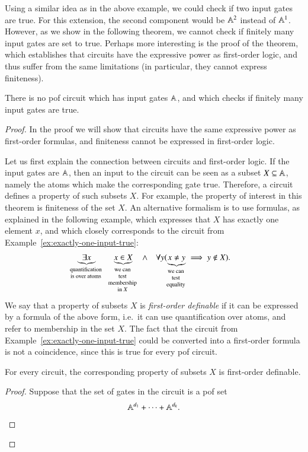 Using a similar idea as in the above example, we could check if two input gates are true. For this extension, the second component would be $\mathbb A^2$ instead of $\mathbb A^1$.  However, as we show in the following theorem, we cannot check if finitely many input gates are set to true. Perhaps more interesting is the proof of the theorem, which establishes that circuits have the expressive power as first-order logic, and thus suffer from the same limitations (in particular, they cannot express finiteness).
\begin{theorem}\label{thm:circuits-finiteness}
	There is no pof circuit which has input gates $\mathbb A$, and which checks if finitely many input gates are true.
\end{theorem}
\begin{proof}
	In the proof we will show that circuits have the same expressive power as first-order formulas, and finiteness cannot be expressed in first-order logic. 

Let us first explain the connection between circuits and first-order logic.
If the input gates are $\mathbb A$, then an input to the circuit can be seen as a subset $X \subseteq \mathbb A$, namely the atoms which make the corresponding gate true. Therefore, a circuit defines a property of such subsets $X$. For example, the property of interest in this theorem is finiteness of the set $X$. An alternative formalism is to use formulas, as explained in the following example, which expresses that $X$ has exactly one element $x$, and which closely  corresponds to the circuit from Example~\ref{ex:exactly-one-input-true}:
	\begin{align}
		\label{eq:circuits-first-order}
	\myunderbrace{\exists x}{quantification \\ is over atoms}
	\qquad 
	\myunderbrace{x \in X}{we can \\ test \\ membership \\ in $X$} \quad \land \quad 
	\forall y (\myunderbrace{x \neq y}{we can \\ test \\ equality} \implies y \not \in X).
	\end{align}
	We say that a property of subsets $X$ is \emph{first-order definable} if it can be expressed by a formula of the above form, i.e.~it can use quantification over atoms, and refer to membership in the set $X$. The fact that the circuit from Example~\ref{ex:exactly-one-input-true} could be converted into a first-order formula is not a coincidence, since this is true for every pof circuit.
	\begin{claim}
		For every circuit, the corresponding property of subsets $X$ is first-order definable.
	\end{claim}
	\begin{proof}
		Suppose that the set of gates in the circuit is a pof set 
		\begin{align*}
		 \mathbb A^{d_1} + \cdots + \mathbb A^{d_k}.
		\end{align*}


\end{proof}
\end{proof}
